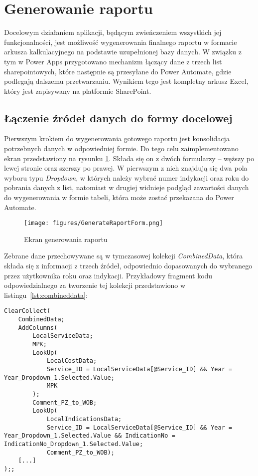 \section{Generowanie raportu}

Docelowym działaniem aplikacji, będącym zwieńczeniem wszystkich jej funkcjonalności, jest możliwość wygenerowania finalnego raportu w formacie arkusza kalkulacyjnego na podstawie uzupełnionej bazy danych. W związku z tym w Power Apps przygotowano mechanizm łączący dane z trzech list sharepointowych, które następnie są przesyłane do Power Automate, gdzie podlegają dalszemu przetwarzaniu. Wynikiem tego jest kompletny arkusz Excel, który jest zapisywany na platformie SharePoint.

\subsection{Łączenie źródeł danych do formy docelowej}

Pierwszym krokiem do wygenerowania gotowego raportu jest konsolidacja potrzebnych danych w odpowiedniej formie. Do tego celu zaimplementowano ekran przedstawiony na rysunku \ref{fig:generateraportform}. Składa się on z dwóch formularzy -- węższy po lewej stronie oraz szerszy po prawej. W pierwszym z nich znajdują się dwa
pola wyboru typu \emph{Dropdown}, w których należy wybrać numer indykacji oraz roku do pobrania danych z list, natomiast w drugiej widnieje podgląd zawartości danych do wygenerowania w formie tabeli, która może zostać przekazana do Power Automate.

\begin{figure}[H]
    \centering
    \texttt{[image: figures/GenerateRaportForm.png]}
    \caption{Ekran generowania raportu}
    \label{fig:generateraportform}
\end{figure}

Zebrane dane przechowywane są w tymczasowej kolekcji \textit{CombinedData}, która składa się z informacji z trzech źródeł, odpowiednio dopasowanych do wybranego przez użytkownika roku oraz indykacji. Przykładowy fragment kodu odpowiedzialnego za tworzenie tej kolekcji przedstawiono w listingu~\ref{lst:combineddata}:

\begin{lstlisting}[language=PowerFx, caption={Fragment kodu tworzącego kolekcję CombinedData}, label={lst:combineddata}] 
    ClearCollect(
    CombinedData;
    AddColumns(
        LocalServiceData;
        MPK;
        LookUp(
            LocalCostData;
            Service_ID = LocalServiceData[@Service_ID] && Year = Year_Dropdown_1.Selected.Value;
            MPK
        );
        Comment_PZ_to_WOB;
        LookUp(
            LocalIndicationsData;
            Service_ID = LocalServiceData[@Service_ID] && Year = Year_Dropdown_1.Selected.Value && IndicationNo = IndicationNo_Dropdown_1.Selected.Value;
            Comment_PZ_to_WOB);     
    [...]
);;

\end{lstlisting}

